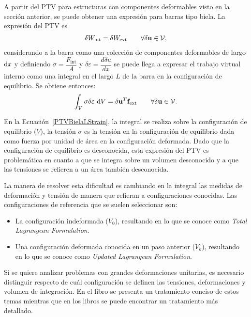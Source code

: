 A partir del PTV para estructuras con componentes deformables visto en la sección anterior, se puede obtener una expresión para barras tipo biela. %
%
La expresión del PTV es
\begin{equation}
\delta W_{\text{int}} = \delta W_{\text{ext}} \qquad \forall \delta {\bf u} \in {\mathcal V},
\end{equation}
%
considerando a la barra como una colección de componentes deformables de largo ${\text{d}} x$ y definiendo $\sigma = \dfrac{ F_{\text{int}} }{A} $ y $\delta \varepsilon = \dfrac{d \delta u} {d x}$ se puede llega a expresar el trabajo virtual interno como una integral en el largo $L$ de la barra en la configuración de equilibrio. %
%
Se obtiene entonces:
%
\begin{equation}\label{PTVBielaLStrain}
\int_{V} \sigma \delta \varepsilon \text{ } {\text{d}} V = \delta {\bf u}^T {\bf f}_{\text{ext}}   \qquad \forall \delta {\bf u} \in {\mathcal V}.
\end{equation}

En la Ecuación~\eqref{PTVBielaLStrain}, la integral se realiza sobre la configuración de equilibrio ($V$), la tensión $\sigma$ es la tensión en la configuración de equilibrio dada como fuerza por unidad de área en la configuración deformada. Dado que la configuración de equilibrio es desconocida, esta expresión del PTV es problemática en cuanto a que se integra sobre un volumen desconocido y a que las tensiones se refieren a un área también desconocida.

La manera de resolver esta dificultad es cambiando en la integral las medidas de deformación y tensión de manera que refieran a configuraciones conocidas. Las configuraciones de referencia que se suelen seleccionar son: 
%
\begin{itemize}
	\item La configuración indeformada ($V_0$), resultando en lo que se conoce como \textit{Total Lagrangean Formulation}.
	\item Una configuración deformada conocida en un paso anterior ($V_{k}$), resultando en lo que se conoce como \textit{Updated Lagrangean Formulation}.
\end{itemize} 

Si se quiere analizar problemas con grandes deformaciones unitarias, es necesario distinguir respecto de cuál configuración se definen las tensiones, deformaciones y volumen de integración. %
%
En el libro \citep{crisfield1996non} se presenta un tratamiento conciso de estos temas mientras que en los libros \citep{Bathe2014,Belytschko2014} se puede encontrar un tratamiento más detallado.

